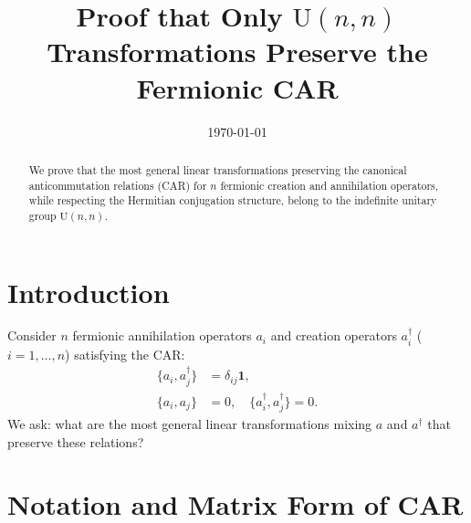 \documentclass[aps,pre,twocolumn,floatfix,superscriptaddress,10pt]{revtex4}
\begin{document}
\title{Proof that Only $\mathrm{U}(n,n)$ Transformations Preserve the
Fermionic CAR}
\author{}
\date{\today}

\begin{abstract}
We prove that the most general linear transformations preserving the
canonical anticommutation relations (CAR) for $n$ fermionic creation and
annihilation operators, while respecting the Hermitian conjugation
structure, belong to the indefinite unitary group $\mathrm{U}(n,n)$.
\end{abstract}

\maketitle

\section{Introduction}

Consider $n$ fermionic annihilation operators $a_i$ and creation operators $%
a_i^\dagger$ ($i=1,\dots,n$) satisfying the CAR: 
\begin{align}
\{a_i, a_j^\dagger\} &= \delta_{ij} \mathbf{1}, \\
\{a_i, a_j\} &= 0, \quad \{a_i^\dagger, a_j^\dagger\} = 0.
\end{align}
We ask: what are the most general linear transformations mixing $a$ and $%
a^\dagger$ that preserve these relations?

\section{Notation and Matrix Form of CAR}
\end{document}
